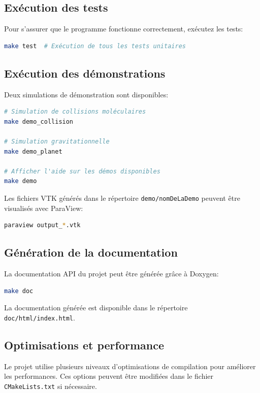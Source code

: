\documentclass[12pt,a4paper]{article}
\begin{document}
\subsection{Exécution des tests}

Pour s'assurer que le programme fonctionne correctement, exécutez les tests:

\begin{lstlisting}[language=bash]
make test  # Exécution de tous les tests unitaires
\end{lstlisting}

\subsection{Exécution des démonstrations}

Deux simulations de démonstration sont disponibles:

\begin{lstlisting}[language=bash]
# Simulation de collisions moléculaires
make demo_collision

# Simulation gravitationnelle
make demo_planet

# Afficher l'aide sur les démos disponibles
make demo
\end{lstlisting}

Les fichiers VTK générés dans le répertoire \texttt{demo/nomDeLaDemo} peuvent être visualisés avec ParaView:

\begin{lstlisting}[language=bash]
paraview output_*.vtk
\end{lstlisting}

\subsection{Génération de la documentation}

La documentation API du projet peut être générée grâce à Doxygen:

\begin{lstlisting}[language=bash]
make doc
\end{lstlisting}

La documentation générée est disponible dans le répertoire \texttt{doc/html/index.html}.

\subsection{Optimisations et performance}

Le projet utilise plusieurs niveaux d'optimisations de compilation pour améliorer les performances. Ces options peuvent être modifiées dans le fichier \texttt{CMakeLists.txt} si nécessaire.
\end{document}
